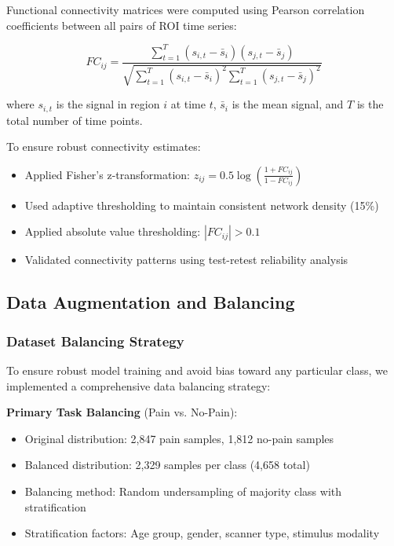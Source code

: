 \documentclass[10pt,journal,compsoc]{IEEEtran}
\begin{document}
Functional connectivity matrices were computed using Pearson correlation coefficients between all pairs of ROI time series:

\begin{equation}
FC_{ij} = \frac{\sum_{t=1}^{T} (s_{i,t} - \bar{s}_i)(s_{j,t} - \bar{s}_j)}{\sqrt{\sum_{t=1}^{T} (s_{i,t} - \bar{s}_i)^2 \sum_{t=1}^{T} (s_{j,t} - \bar{s}_j)^2}}
\end{equation}

where $s_{i,t}$ is the signal in region $i$ at time $t$, $\bar{s}_i$ is the mean signal, and $T$ is the total number of time points.

To ensure robust connectivity estimates:
\begin{itemize}
\item Applied Fisher's z-transformation: $z_{ij} = 0.5 \log\left(\frac{1 + FC_{ij}}{1 - FC_{ij}}\right)$
\item Used adaptive thresholding to maintain consistent network density (15\%)
\item Applied absolute value thresholding: $|FC_{ij}| > 0.1$
\item Validated connectivity patterns using test-retest reliability analysis
\end{itemize}

\subsection{Data Augmentation and Balancing}

\subsubsection{Dataset Balancing Strategy}

To ensure robust model training and avoid bias toward any particular class, we implemented a comprehensive data balancing strategy:

\textbf{Primary Task Balancing} (Pain vs. No-Pain):
\begin{itemize}
\item Original distribution: 2,847 pain samples, 1,812 no-pain samples
\item Balanced distribution: 2,329 samples per class (4,658 total)
\item Balancing method: Random undersampling of majority class with stratification
\item Stratification factors: Age group, gender, scanner type, stimulus modality
\end{itemize}
\end{document}
